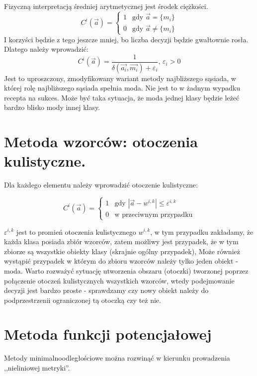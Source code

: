 \documentclass[a4paper,10pt]{article}
\begin{document}
Fizyczną interpretacją średniej arytmetycznej jest środek ciężkości.
\begin{equation}
 C^i(\overrightarrow{a}) = 
\begin{cases} 1 & \mbox{gdy }\overrightarrow{a} = \{m_i\}\\
 0 & \mbox{gdy }\overrightarrow{a} \neq \{m_i\}
\end{cases}
\end{equation}
I korzyści będzie z tego jeszcze mniej, bo liczba decyzji będzie gwałtownie rosła. Dlatego należy wprowadzić:
\begin{equation}
C^i(\overrightarrow{a}) = \frac{1}{\delta(\overrightarrow{a_i}, \overrightarrow{m_i}) + \varepsilon_i}\mbox{, }    \varepsilon_i > 0 
\end{equation}
Jest to uproszczony, zmodyfikowany wariant metody najbliższego sąsiada, w której rolę najbliższego sąsiada spełnia moda.
Nie jest to w żadnym wypadku recepta na sukces. Może być taka sytuacja, że moda jednej klasy będzie leżeć bardzo blisko mody innej klasy.

\section{Metoda wzorców: otoczenia kulistyczne.}
Dla każdego elementu należy wprowadzić otoczenie kulistyczne:

\begin{equation}
 C^i(\overrightarrow{a}) = 
\begin{cases} 1 & \mbox{gdy $|\overrightarrow{a} - w^{i,k}| \leq \varepsilon^{i,k}$}\\
 0 & \mbox{w przeciwnym przypadku}
\end{cases}
\end{equation}

$\varepsilon^{i,k}$ jest to promień otoczenia kulistycznego $w^{i,k}$, w tym przypadku zakładamy, że każda klasa posiada zbiór wzorców, zatem możliwy jest przypadek, że w tym zbiorze są wszystkie obiekty klasy (skrajnie ogólny przypadek), Może również wystąpić przypadek w którym do zbioru wzorców należy tylko jeden obiekt - moda.
Warto rozważyć sytuację utworzenia obszaru (otoczki) tworzonej poprzez połączenie otoczeń kulistycznych wszystkich wzorców, wtedy podejmowanie decyzji jest bardzo proste - sprawdzamy czy nowy obiekt należy do podprzestrzenii ograniczonej tą otoczką czy też nie.

\section{Metoda funkcji potencjałowej}
Metody minimalnoodległościowe można rozwinąć w kierunku prowadzenia ,,nieliniowej metryki''.
\end{document}
